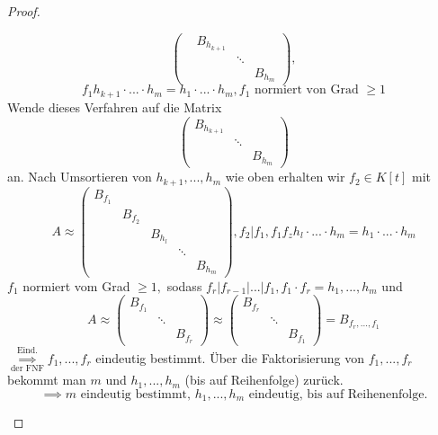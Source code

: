 \documentclass[a4paper, titlepage]{article}
\theoremstyle{definition}
\begin{document}
\begin{proof}
\begin{enumerate}[1.]
$$\begin{pmatrix}
        & B_{h_{k+1}}& & \\
        & & \ddots &\\
        & & & B_{h_m}
    \end{pmatrix}, $$ $$f_1h_{k+1}\cdot...\cdot h_m=h_1\cdot ... \cdot h_m, f_1 \text{ normiert von Grad }\geq 1$$
    Wende dieses Verfahren auf die Matrix 
    $$\begin{pmatrix}
         B_{h_{k+1}}& & \\
         & \ddots &\\
        & & B_{h_m}
    \end{pmatrix}$$ an. Nach Umsortieren von $h_{k+1},...,h_{m}$ wie oben erhalten wir $f_2\in K[t]$ mit 
    $$A\approx \begin{pmatrix}
        B_{f_1}& & & & \\
        & B_{f_2}& & &\\
        & &B_{h_l}& &\\
        & & &\ddots & \\
        & & & &B_{h_m}
    \end{pmatrix}, f_2|f_1, f_1f_zh_l\cdot...\cdot h_m=h_1\cdot ... \cdot h_m$$
    $f_1$ normiert vom Grad $\geq 1,$ sodass $f_r|f_{r-1}|...|f_1, f_1\cdot f_r=h_1,...,h_m$ und 
    $$A\approx \begin{pmatrix}
        B_{f_1}& &\\
        &\ddots &\\
    & &B_{f_r}\end{pmatrix}
    \approx \begin{pmatrix}
        B_{f_r}& &\\
        &\ddots & \\
    & &B_{f_1}\end{pmatrix}= B_{f_r,...,f_1}$$
    $\overset{\text{Eind.}}{\underset{\text{der FNF}}{\implies}} f_1,...,f_r$ eindeutig bestimmt. Über die Faktorisierung von $f_1,...,f_r$ bekommt man $m$ und $h_1,...,h_m$ (bis auf Reihenfolge) zurück. 
    $$\implies m \text{ eindeutig bestimmt, }h_1,...,h_m \text{ eindeutig, bis auf Reihenenfolge}.$$
    \end{enumerate}
\end{proof}
\end{document}
